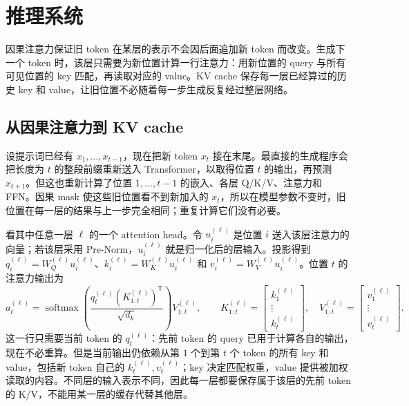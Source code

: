 \chapter{推理系统}
\label{chap:inference-systems}

\begin{keybox}[先弄清楚缓存了什么]
因果注意力保证旧 token 在某层的表示不会因后面追加新 token 而改变。生成下一个 token 时，该层只需要为新位置计算一行注意力：用新位置的 query 与所有可见位置的 key 匹配，再读取对应的 value。KV cache 保存每一层已经算过的历史 key 和 value，让旧位置不必随着每一步生成反复经过整层网络。
\end{keybox}

\section{从因果注意力到 KV cache}

设提示词已经有 \(x_1,\ldots,x_{t-1}\)，现在把新 token \(x_t\) 接在末尾。最直接的生成程序会把长度为 \(t\) 的整段前缀重新送入 Transformer，以取得位置 \(t\) 的输出，再预测 \(x_{t+1}\)。但这也重新计算了位置 \(1,\ldots,t-1\) 的嵌入、各层 Q/K/V、注意力和 FFN。因果 mask 使这些旧位置看不到新加入的 \(x_t\)，所以在模型参数不变时，旧位置在每一层的结果与上一步完全相同；重复计算它们没有必要。

看其中任意一层 \(\ell\) 的一个 attention head。令 \(u_i^{(\ell)}\) 是位置 \(i\) 送入该层注意力的向量；若该层采用 Pre-Norm，\(u_i^{(\ell)}\) 就是归一化后的层输入。投影得到 \(q_i^{(\ell)}=W_Q^{(\ell)}u_i^{(\ell)}\)、\(k_i^{(\ell)}=W_K^{(\ell)}u_i^{(\ell)}\) 和 \(v_i^{(\ell)}=W_V^{(\ell)}u_i^{(\ell)}\)。位置 \(t\) 的注意力输出为
\begin{equation}
 a_t^{(\ell)}=\operatorname{softmax}\!\left(
 \frac{q_t^{(\ell)}(K_{1:t}^{(\ell)})^{\mathsf T}}{\sqrt{d_k}}
 \right)V_{1:t}^{(\ell)},\qquad
 K_{1:t}^{(\ell)}=\begin{bmatrix}k_1^{(\ell)}\\ \vdots\\ k_t^{(\ell)}\end{bmatrix},\quad
 V_{1:t}^{(\ell)}=\begin{bmatrix}v_1^{(\ell)}\\ \vdots\\ v_t^{(\ell)}\end{bmatrix}.
 \label{eq:kv-cache-one-row}
\end{equation}
这一行只需要当前 token 的 \(q_t^{(\ell)}\)：先前 token 的 query 已用于计算各自的输出，现在不必重算。但是当前输出仍依赖从第 \(1\) 个到第 \(t\) 个 token 的所有 key 和 value，包括新 token 自己的 \(k_t^{(\ell)},v_t^{(\ell)}\)；key 决定匹配权重，value 提供被加权读取的内容。不同层的输入表示不同，因此每一层都要保存属于该层的先前 token 的 K/V，不能用某一层的缓存代替其他层。


